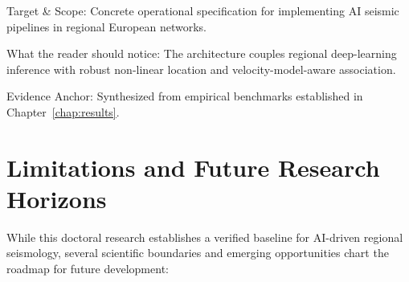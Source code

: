 \begin{landscape}
\begin{table}[htbp]
\begin{threeparttable}
\begin{tablenotes}[flushleft]
        \footnotesize
      \item Target \& Scope: Concrete operational specification for
        implementing AI seismic pipelines in regional European networks.
      \item What the reader should notice: The architecture couples
        regional deep-learning inference with robust non-linear
        location and velocity-model-aware association.
      \item Evidence Anchor: Synthesized from empirical benchmarks
        established in Chapter~\ref{chap:results}.
      \end{tablenotes}
    \end{threeparttable}
  \end{table}
\end{landscape}

\section{Limitations and Future Research Horizons}
\label{sec:conclusion_future_work}

While this doctoral research establishes a verified baseline for
AI-driven regional seismology, several scientific boundaries and
emerging opportunities chart the roadmap for future development:

